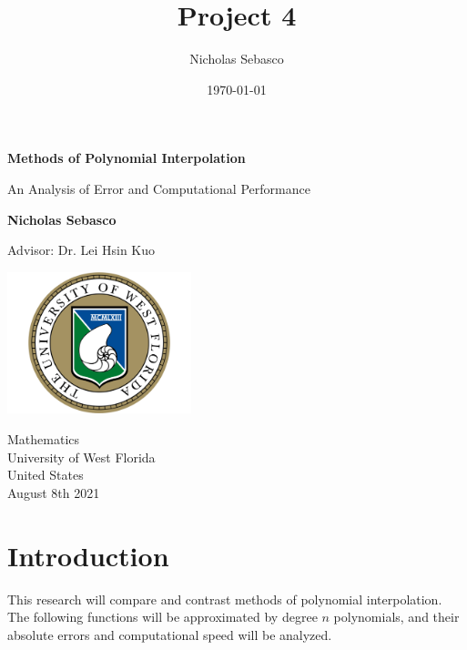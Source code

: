 \documentclass[11pt]{article}%
\title{\textbf{\huge\raggedleft Project 4}}
\author{Nicholas Sebasco}
\date{\today}
\begin{document}
\begin{titlepage}
    \begin{center}
        \vspace*{1cm}
            
        \Huge
        \textbf{Methods of Polynomial Interpolation}
            
        \vspace{0.5cm}
        \LARGE
        An Analysis of Error and Computational Performance
            
        \vspace{1.5cm}
            
        \textbf{Nicholas Sebasco}
            
        \vfill
            
       	Advisor: Dr. Lei Hsin Kuo\\
            
        \vspace{0.8cm}
            
        \includegraphics[width=0.4\textwidth]{logo}
            
        \Large
        Mathematics\\
        University of West Florida\\
        United States\\
        August 8th 2021
            
    \end{center}
\end{titlepage}


\section*{Introduction}
%
This research will compare and contrast methods of polynomial interpolation. The following functions will be approximated by degree $n$ polynomials, and their absolute errors and computational speed will be analyzed.
\end{document}
